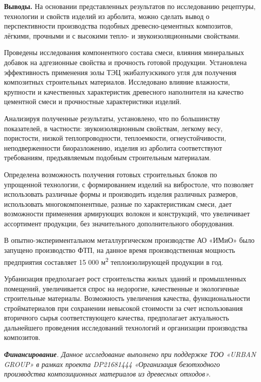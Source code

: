 {\bfseries Выводы.} На основании представленных результатов по исследованию
рецептуры, технологии и свойств изделий из арболита, можно сделать вывод
о перспективности производства подобных древесно-цементных композитов,
лёгкими, прочными и с высокими тепло- и звукоизоляционными свойствами.

Проведены исследования компонентного состава смеси, влияния минеральных
добавок на адгезионные свойства и прочность готовой продукции.
Установлена эффективность применения золы ТЭЦ экибазтузскикого угля для
получения композитных строительных материалов. Исследовано влияние
влажности, крупности и качественных характеристик древесного наполнителя
на качество цементной смеси и прочностные характеристики изделий.

Анализируя полученные результаты, установлено, что по большинству
показателей, в частности: звукоизоляционным свойствам, легкому весу,
пористости, низкой теплопроводности, теплоемкости, огнеустойчивости,
неподверженности биоразложению, изделия из арболита соответствуют
требованиям, предъявляемым подобным строительным материалам.

Определена возможность получения готовых строительных блоков по
упрощенной технологии, с формированием изделий на вибростоле, что
позволяет использовать различные формы и производить изделия различных
размеров, использовать многокомпонентные, разные по характеристикам
смеси, дает возможности применения армирующих волокон и конструкций, что
увеличивает ассортимент продукции, без значительного дополнительного
оборудования.

В опытно-экспериментальном металлургическом производстве АО «ИМиО» было
запущено производство ФТП, на данное время производственная мощность
предприятия составляет 15 000 м\textsuperscript{2} теплоизолирующей
продукции в год.

Урбанизация предполагает рост строительства жилых зданий и промышленных
помещений, увеличивается спрос на недорогие, качественные и экологичные
строительные материалы. Возможность увеличения качества,
функциональности стройматериалов при сохранении невысокой стоимости за
счет использования вторичного сырья соответствующего качества,
предполагает актуальность дальнейшего проведения исследований технологий
и организации производства композитов.

\emph{{\bfseries Финансирование}. Данное исследование выполнено при
поддержке ТОО «URBAN GROUP» в рамках проекта DP21681444 «Организация
безотходного производства композиционных материалов из древесных
отходов».}

